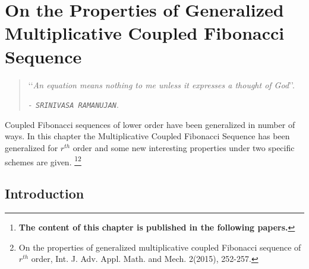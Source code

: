 %
%
\let\textcircled=\pgftextcircled
\chapter{On the Properties of Generalized  Multiplicative Coupled Fibonacci   Sequence }
\label{chap:On the Properties of Generalized Multiplicative Coupled Fibonacci Sequence }
\begin{quote}
\textcolor[rgb]{0.25,0.40,0.60}{\lq\lq\textsl{An equation means nothing to
me unless it expresses a thought of God}\rq\rq}.
\begin{flushright}
\textcolor[rgb]{0.55,0.00,0.55}{\em-\texttt{ SRINIVASA RAMANUJAN}}.
\end{flushright}
\end{quote}


Coupled Fibonacci sequences of lower order have been generalized in number of ways. In this chapter the Multiplicative Coupled Fibonacci Sequence has been generalized for $r^{th}$  order and some new interesting properties under two specific schemes are given.
\vspace{2mm}
\let\thefootnote\relax\footnote{\textbf{\hspace{-0.78cm}The content of this chapter is published in the following papers.}}\footnote{\hspace{-0.78cm}On the properties of generalized multiplicative coupled Fibonacci sequence of $r^{th}$ order, Int. J. Adv. Appl. Math. and Mech. 2(2015), 252-257.}
\section{Introduction}
